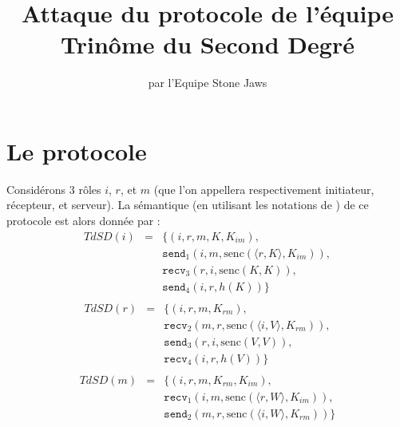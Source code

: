 \documentclass[a4paper,10pt]{article}
\title{Attaque du protocole de l'équipe Trinôme du Second Degré}
\author{par l'Equipe Stone Jaws}
\begin{document}
\maketitle

\section{Le protocole}

Considérons 3 rôles $i$, $r$, et $m$ (que l'on appellera respectivement initiateur, récepteur, et serveur). La sémantique (en utilisant les notations de \cite{cas}) de ce protocole est alors donnée par :
\begin{eqnarray*}
	TdSD(i) & = & \{ (i,r,m, K, K_{im}), \\
		& & \texttt{send}_1(i,m, \textrm{senc}(\langle r,K \rangle, K_{im}) ), \\
		& & \texttt{recv}_3(r,i,  \textrm{senc}(K,K) ),\\
		& & \texttt{send}_4(i,r, h(K)) \} \\
\end{eqnarray*}
\begin{eqnarray*}
	TdSD(r) & = & \{ (i,r,m, K_{rm}), \\
		& & \texttt{recv}_2(m,r, \textrm{senc}(\langle i,V \rangle, K_{rm}) ), \\
		& & \texttt{send}_3(r,i,  \textrm{senc}(V,V) ),\\
		& & \texttt{recv}_4(i,r, h(V)) \} \\
\end{eqnarray*}
\begin{eqnarray*}
	TdSD(m) & = & \{ (i,r,m, K_{rm}, K_{im}), \\
		& & \texttt{recv}_1(i,m, \textrm{senc}(\langle r,W \rangle, K_{im}) ), \\
		& & \texttt{send}_2(m,r, \textrm{senc}(\langle i,W \rangle, K_{rm}) )  \} \\
\end{eqnarray*}
\end{document}
